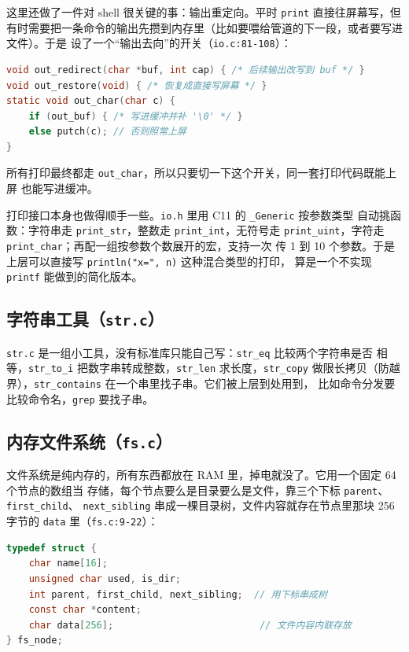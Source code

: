 \documentclass[12pt, a4paper]{ctexart}
\begin{document}
这里还做了一件对 shell 很关键的事：输出重定向。平时 \lstinline|print| 直接往屏幕写，但
有时需要把一条命令的输出先攒到内存里（比如要喂给管道的下一段，或者要写进文件）。于是
设了一个“输出去向”的开关（\lstinline|io.c:81-108|）：

\begin{lstlisting}[language=C]
void out_redirect(char *buf, int cap) { /* 后续输出改写到 buf */ }
void out_restore(void) { /* 恢复成直接写屏幕 */ }
static void out_char(char c) {
    if (out_buf) { /* 写进缓冲并补 '\0' */ }
    else putch(c); // 否则照常上屏
}
\end{lstlisting}

所有打印最终都走 \lstinline|out_char|，所以只要切一下这个开关，同一套打印代码既能上屏
也能写进缓冲。

打印接口本身也做得顺手一些。\lstinline|io.h| 里用 C11 的 \lstinline|_Generic| 按参数类型
自动挑函数：字符串走 \lstinline|print_str|，整数走 \lstinline|print_int|，无符号走
\lstinline|print_uint|，字符走 \lstinline|print_char|；再配一组按参数个数展开的宏，支持一次
传 1 到 10 个参数。于是上层可以直接写 \lstinline|println("x=", n)| 这种混合类型的打印，
算是一个不实现 \lstinline|printf| 能做到的简化版本。

\subsection{字符串工具（\texttt{str.c}）}

\lstinline|str.c| 是一组小工具，没有标准库只能自己写：\lstinline|str_eq| 比较两个字符串是否
相等，\lstinline|str_to_i| 把数字串转成整数，\lstinline|str_len| 求长度，\lstinline|str_copy|
做限长拷贝（防越界），\lstinline|str_contains| 在一个串里找子串。它们被上层到处用到，
比如命令分发要比较命令名，\lstinline|grep| 要找子串。

\subsection{内存文件系统（\texttt{fs.c}）}

文件系统是纯内存的，所有东西都放在 RAM 里，掉电就没了。它用一个固定 64 个节点的数组当
存储，每个节点要么是目录要么是文件，靠三个下标 \lstinline|parent|、\lstinline|first_child|、
\lstinline|next_sibling| 串成一棵目录树，文件内容就存在节点里那块 256 字节的
\lstinline|data| 里（\lstinline|fs.c:9-22|）：

\begin{lstlisting}[language=C]
typedef struct {
    char name[16];
    unsigned char used, is_dir;
    int parent, first_child, next_sibling;  // 用下标串成树
    const char *content;
    char data[256];                          // 文件内容内联存放
} fs_node;
\end{lstlisting}
\end{document}
